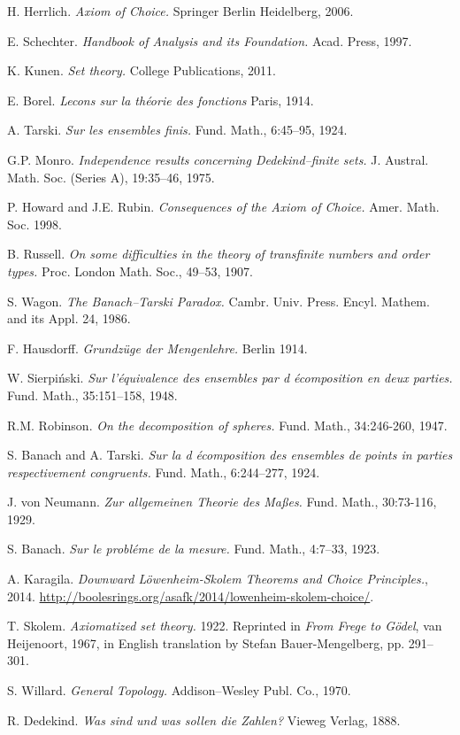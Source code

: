 \documentclass[12pt,a4paper]{report}
\theoremstyle{definition}
\theoremstyle{num.custom-title}
\begin{document}
\begin{thebibliography}{3}

H. Herrlich. \emph{Axiom of Choice.} Springer Berlin Heidelberg, 2006.

E. Schechter. \emph{Handbook of Analysis and its Foundation.} Acad. Press, 1997.

K. Kunen. \emph{Set theory.} College Publications, 2011.

E. Borel. \emph{Lecons sur la théorie des fonctions} Paris, 1914.

A. Tarski. \emph{Sur les ensembles finis.} Fund. Math., 6:45–95, 1924.

G.P. Monro. \emph{Independence results concerning Dedekind–finite sets.} J. Austral. Math. Soc. (Series A), 19:35–46, 1975.

P. Howard and J.E. Rubin. \emph{Consequences of the Axiom of Choice.} Amer. Math. Soc. 1998.

B. Russell. \emph{On some difficulties in the theory of transfinite numbers and order types.} Proc. London Math. Soc., 49–53, 1907.

S. Wagon. \emph{The Banach–Tarski Paradox.} Cambr. Univ. Press. Encyl. Mathem. and its Appl. 24, 1986.

F. Hausdorff. \emph{Grundzüge der Mengenlehre.} Berlin 1914.

W. Sierpiński. \emph{Sur l'équivalence des ensembles par d écomposition en deux parties.} Fund. Math., 35:151–158, 1948.

R.M. Robinson. \emph{On the decomposition of spheres.} Fund. Math., 34:246-260, 1947.

S. Banach and A. Tarski. \emph{Sur la d écomposition des ensembles de points in parties respectivement congruents.} Fund. Math., 6:244–277, 1924.

J. von Neumann. \emph{Zur allgemeinen Theorie des Maßes.} Fund. Math., 30:73-116, 1929.

S. Banach. \emph{Sur le probléme de la mesure.} Fund. Math., 4:7–33, 1923.

A. Karagila. \emph{Downward Löwenheim-Skolem Theorems and Choice Principles.}, 2014. \url{http://boolesrings.org/asafk/2014/lowenheim-skolem-choice/}.

T. Skolem. \emph{Axiomatized set theory.} 1922. Reprinted in \emph{From Frege to Gödel}, van Heijenoort, 1967, in English translation by Stefan Bauer-Mengelberg, pp. 291–301.

S. Willard. \emph{General Topology.} Addison–Wesley Publ. Co., 1970.

R. Dedekind. \emph{Was sind und was sollen die Zahlen?} Vieweg Verlag, 1888.

\end{thebibliography}
\end{document}
